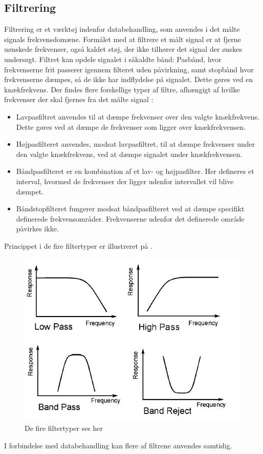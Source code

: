 \subsection{Filtrering}
Filtrering er et værktøj indenfor databehandling, som anvendes i det målte signals frekvensdomæne. Formålet med at filtrere et målt signal er at fjerne uønskede frekvenser, også kaldet støj, der ikke tilhører det signal der ønskes undersøgt. Filtret kan opdele signalet i såkaldte bånd: Pasbånd, hvor frekvenserne frit passerer igennem filteret uden påvirkning, samt stopbånd hvor frekvenserne dæmpes, så de ikke har indflydelse på signalet. Dette gøres ved en knækfrekvens.
Der findes flere forskellige typer af filtre, afhængigt af hvilke frekvenser der skal fjernes fra det målte signal \cite{Devasahayam2000}:

\begin{itemize}
	\item Lavpasfiltret anvendes til at dæmpe frekvenser over den valgte knækfrekvens. Dette gøres ved at dæmpe de frekvenser som ligger over knækfrekvensen.
	\item Højpasfilteret anvendes, modsat lavpasfiltret, til at dæmpe frekvenser under den valgte knækfrekvens, ved at dæmpe signalet under knækfrekvensen.
	\item Båndpasfilteret er en kombination af et lav- og højpasfilter.  Her defineres et interval, hvormed de frekvenser der ligger udenfor intervallet vil blive dæmpet.
	\item Båndstopfilteret fungerer modsat båndpasfilteret ved at dæmpe specifikt definerede frekvensområder. Frekvenserne udenfor det definerede område påvirkes ikke. 
\end{itemize}
  
Princippet i de fire filtertyper er illustreret på .
\begin{figure}[H]
\centering
\includegraphics[scale=1.0]{figures/bproblemanalyse/filtertyper.png}
\caption{De fire filtertyper ses her \cite{2. semester kristian}}
\label{fig:filtertyper}
\end{figure}
I forbindelse med databehandling kan flere af filtrene anvendes samtidig. \cite{Devasahayam2000}


